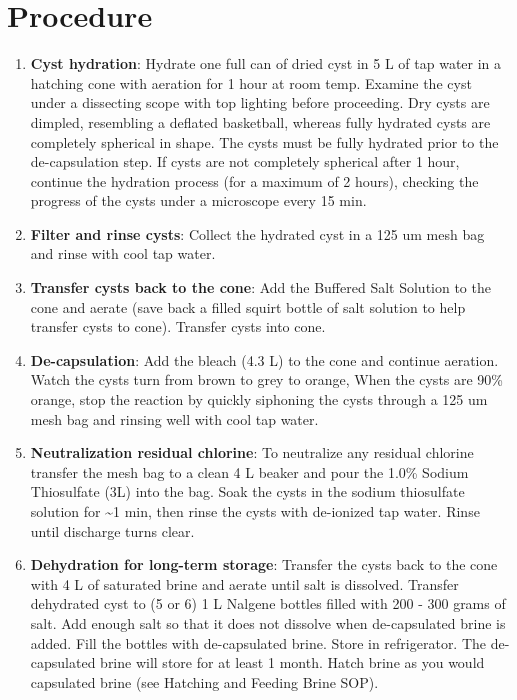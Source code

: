 \documentclass[
  letterpaper,
  DIV=11,
  numbers=noendperiod]{scrreprt}
\begin{document}
\hypertarget{procedure-8}{%
\section{Procedure}\label{procedure-8}}

\begin{enumerate}
\def\labelenumi{\arabic{enumi}.}
\item
  \textbf{Cyst hydration}: Hydrate one full can of dried cyst in 5 L of
  tap water in a hatching cone with aeration for 1 hour at room temp.
  Examine the cyst under a dissecting scope with top lighting before
  proceeding. Dry cysts are dimpled, resembling a deflated basketball,
  whereas fully hydrated cysts are completely spherical in shape. The
  cysts must be fully hydrated prior to the de-capsulation step. If
  cysts are not completely spherical after 1 hour, continue the
  hydration process (for a maximum of 2 hours), checking the progress of
  the cysts under a microscope every 15 min.
\item
  \textbf{Filter and rinse cysts}: Collect the hydrated cyst in a 125 um
  mesh bag and rinse with cool tap water.
\item
  \textbf{Transfer cysts back to the cone}: Add the Buffered Salt
  Solution to the cone and aerate (save back a filled squirt bottle of
  salt solution to help transfer cysts to cone). Transfer cysts into
  cone.
\item
  \textbf{De-capsulation}: Add the bleach (4.3 L) to the cone and
  continue aeration. Watch the cysts turn from brown to grey to orange,
  When the cysts are 90\% orange, stop the reaction by quickly siphoning
  the cysts through a 125 um mesh bag and rinsing well with cool tap
  water.
\item
  \textbf{Neutralization residual chlorine}: To neutralize any residual
  chlorine transfer the mesh bag to a clean 4 L beaker and pour the
  1.0\% Sodium Thiosulfate (3L) into the bag. Soak the cysts in the
  sodium thiosulfate solution for \textasciitilde1 min, then rinse the
  cysts with de-ionized tap water. Rinse until discharge turns clear.
\item
  \textbf{Dehydration for long-term storage}: Transfer the cysts back to
  the cone with 4 L of saturated brine and aerate until salt is
  dissolved. Transfer dehydrated cyst to (5 or 6) 1 L Nalgene bottles
  filled with 200 - 300 grams of salt. Add enough salt so that it does
  not dissolve when de-capsulated brine is added. Fill the bottles with
  de-capsulated brine. Store in refrigerator. The de-capsulated brine
  will store for at least 1 month. Hatch brine as you would capsulated
  brine (see Hatching and Feeding Brine SOP).
\end{enumerate}
\end{document}

